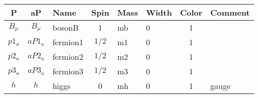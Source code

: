 \begin{tabular}{|cc|l|c|l|l|c|l|} \hline
P & aP & Name & Spin & Mass & Width & Color &  Comment \\ \hline
$B{}_{\mu }$&$B{}_{\mu }$&bosonB        &1           &mb    &0     &1    &   \\
$p1_{a}$  &$aP1_{a}$ &fermion1      &$1/2$       &m1    &0     &1    &   \\
$p2_{a}$  &$aP2_{a}$ &fermion2      &$1/2$       &m2    &0     &1    &   \\
$p3_{a}$  &$aP3_{a}$ &fermion3      &$1/2$       &m3    &0     &1    &   \\
$h_{}$    &$h_{}$    &higgs         &0           &mh    &0     &1    &gauge\\ \hline
\end{tabular}
